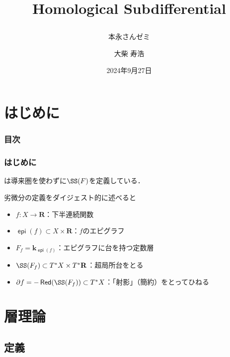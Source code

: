\documentclass[dvipdfmx,12pt,aspectratio=169,leqno]{beamer}%
\title{Homological Subdifferential
\subtitle{本永さんゼミ}}
\date{2024年9月27日}
\author{大柴 寿浩}
\newcommand{\rr}{\mathbf{R}}
\newcommand{\kk}{\mathbf{k}}
\newcommand{\p}{\partial}
\numberwithin{equation}{subsection}
\newcommand{\Red}{\mathop{\mathsf{Red}}\nolimits}
\newcommand{\epi}{\mathop{\mathsf{epi}}\nolimits}
\theoremstyle{mystyle}
\begin{document}
\begin{frame}
    \titlepage
\end{frame}

\section*{はじめに}
\begin{frame}
    \frametitle{目次}
    \tableofcontents
\end{frame}

\begin{frame}
    \frametitle{はじめに}
    \cite{Ike24}は導来圏を使わずに\(\SS(F)\)を定義している．

    \bigskip
    劣微分の定義をダイジェスト的に述べると
    \begin{itemize}
        \item \(f\colon X\to \rr\)：下半連続関数
        \item \(\epi(f)\subset X\times \rr\)：\(f\)のエピグラフ
        \item \(F_{f}=\kk_{\epi(f)}\)：エピグラフに台を持つ定数層
        \item \(\SS(F_{f})\subset T^{\ast}X\times T^{\ast}\rr\)：超局所台をとる
        \item \(\p f = -\Red(\SS(F_{f}))\subset T^{\ast}X\)：「射影」（簡約）をとってひねる
    \end{itemize}
\end{frame}
\section[層]{層理論}
\subsection{定義}
\end{document}
